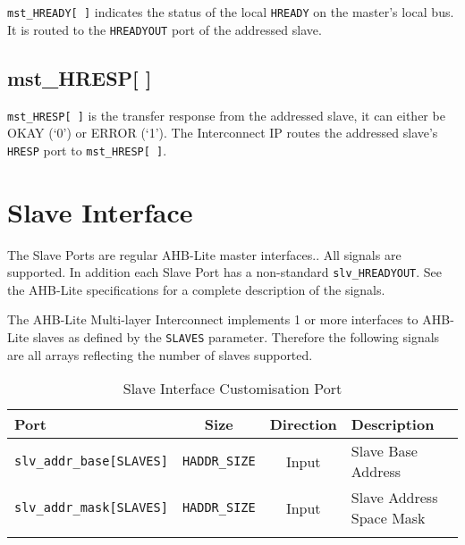 \texttt{mst\_HREADY[\,]} indicates the status of the local \texttt{HREADY} on the master's
local bus. It is routed to the \texttt{HREADYOUT} port of the addressed slave.

\subsection{mst\_HRESP[ ]}\label{mst_hresp}

\texttt{mst\_HRESP[\,]} is the transfer response from the addressed slave, it can
either be OKAY (`0') or ERROR (`1'). The Interconnect IP routes the
addressed slave's \texttt{HRESP} port to \texttt{mst\_HRESP[\,]}.

\section{Slave Interface}\label{slave-interface}

The Slave Ports are regular AHB-Lite master interfaces.. All signals are
supported. In addition each Slave Port has a non-standard
\texttt{slv\_HREADYOUT}. See the AHB-Lite specifications for a complete
description of the signals.

The AHB-Lite Multi-layer Interconnect implements 1 or more interfaces to AHB-Lite slaves
as defined by the \texttt{SLAVES} parameter. Therefore the following signals are all
arrays reflecting the number of slaves supported.

\begin{longtable}[]{@{}lccl@{}}
\toprule
Port & Size & Direction & Description\tabularnewline
\midrule
\endhead
\texttt{slv\_addr\_base[SLAVES]} & \texttt{HADDR\_SIZE} & Input  & Slave Base Address\tabularnewline
\texttt{slv\_addr\_mask[SLAVES]} & \texttt{HADDR\_SIZE} & Input  & Slave Address Space Mask\tabularnewline
\bottomrule
\caption{Slave Interface Customisation Port}
\end{longtable}

